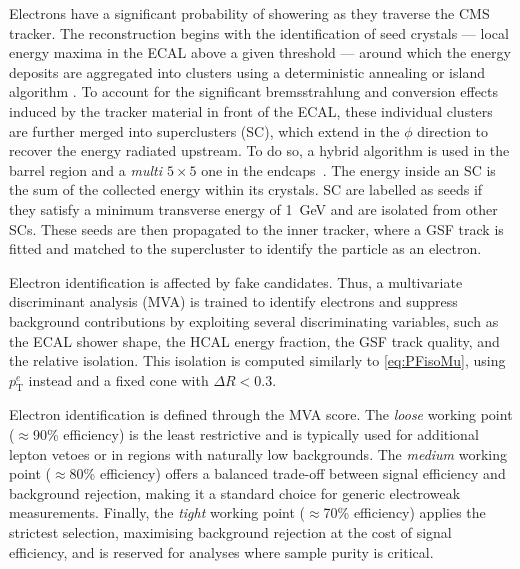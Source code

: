 Electrons have a significant probability of showering as they traverse the CMS tracker. The reconstruction begins with the identification of seed crystals --- local energy maxima in the ECAL above a given threshold --- around which the energy deposits are aggregated into clusters using a deterministic annealing or island algorithm \cite{islandAlgorithm}. To account for the significant bremsstrahlung and conversion effects induced by the tracker material in front of the ECAL, these individual clusters are further merged into superclusters (SC), which extend in the $\phi$ direction to recover the energy radiated upstream. To do so, a hybrid algorithm is used in the barrel region and a \textit{multi $5\times5$} one in the endcaps~\cite{ElectronReconstruction}. The energy inside an SC is the sum of the collected energy within its crystals. SC are labelled as seeds if they satisfy a minimum transverse energy of 1~GeV and are isolated from other SCs. These seeds are then propagated to the inner tracker, where a GSF track is fitted and matched to the supercluster to identify the particle as an electron.

Electron identification is affected by fake candidates. Thus, a multivariate discriminant analysis (MVA) is trained to identify electrons and suppress background contributions by exploiting several discriminating variables, such as the ECAL shower shape, the HCAL energy fraction, the GSF track quality, and the relative isolation. This isolation is computed similarly to \cref{eq:PFisoMu}, using $p_{\mathrm{T}}^e$ instead and a fixed cone with $\Delta R<0.3$.

Electron identification is defined through the MVA score. The \textit{loose} working point ($\approx$90\% efficiency) is the least restrictive and is typically used for additional lepton vetoes or in regions with naturally low backgrounds. The \textit{medium} working point ($\approx$80\% efficiency) offers a balanced trade-off between signal efficiency and background rejection, making it a standard choice for generic electroweak measurements. Finally, the \textit{tight} working point ($\approx$70\% efficiency) applies the strictest selection, maximising background rejection at the cost of signal efficiency, and is reserved for analyses where sample purity is critical.

\vspace{0.5 cm}

